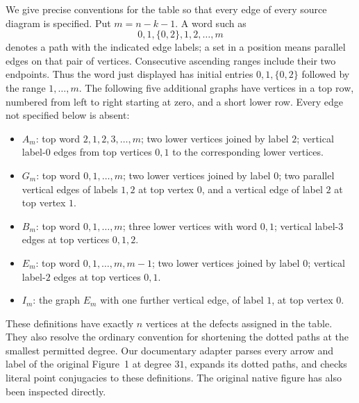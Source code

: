 \documentclass[11pt,a4paper]{article}
\begin{document}
We give precise conventions for the table so that every edge of every
source diagram is specified. Put $m=n-k-1$. A word such as
\[
                0,1,\{0,2\},1,2,\ldots,m
\]
denotes a path with the indicated edge labels; a set in a position means
parallel edges on that pair of vertices. Consecutive ascending ranges
include their two endpoints. Thus the word just displayed has initial
entries $0,1,\{0,2\}$ followed by the range $1,\ldots,m$.
The following five additional graphs have vertices in a top row,
numbered from left to right starting at zero, and a short lower row.
Every edge not specified below is absent:
\begin{itemize}
\item $A_m$: top word $2,1,2,3,\ldots,m$; two lower vertices
joined by label $2$; vertical label-$0$ edges from top vertices $0,1$
to the corresponding lower vertices.
\item $G_m$: top word $0,1,\ldots,m$; two lower vertices joined
by label $0$; two parallel vertical edges of labels $1,2$ at top
vertex $0$, and a vertical edge of label $2$ at top vertex $1$.
\item $B_m$: top word $0,1,\ldots,m$; three lower vertices with
word $0,1$; vertical label-$3$ edges at top vertices $0,1,2$.
\item $E_m$: top word $0,1,\ldots,m,m-1$; two lower vertices
joined by label $0$; vertical label-$2$ edges at top vertices $0,1$.
\item $I_m$: the graph $E_m$ with one further vertical edge,
of label $1$, at top vertex $0$.
\end{itemize}
These definitions have exactly $n$ vertices at the defects assigned
in the table. They also resolve the ordinary convention for shortening
the dotted paths at the smallest permitted degree. Our documentary
adapter parses every arrow and label of the original Figure~1 at
degree $31$, expands its dotted paths, and checks literal point
conjugacies to these definitions. The original native figure has
also been inspected directly.
\end{document}
